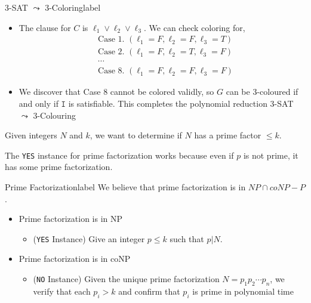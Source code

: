 \begin{ex}{3-SAT $\leadsto$ 3-Coloring}{label}
\begin{itemize}
 			\item The clause for $C$ is $\ell_1 \lor \ell_2 \lor \ell_3$. We can check coloring for,
 			\begin{align*}
 				&\text{Case 1. $(\ell_1 = F, \ell_2 = F, \ell_3 = T)$} \\
 				&\text{Case 2. $(\ell_1 = F, \ell_2 = T, \ell_3 = F)$} \\
 				&\cdots \\
 				&\text{Case 8. $(\ell_1 = F, \ell_2 = F, \ell_3 = F)$}
 			\end{align*}
 			\item We discover that Case 8 cannot be colored validly, so $G$ can be 3-coloured if and only if $\texttt{I}$ is satisfiable. This completes the polynomial reduction 3-SAT $\leadsto$ 3-Colouring
 		\end{itemize}
 	\end{ex}

 	\begin{defn}
 		Given integers $N$ and $k$, we want to determine if $N$ has a prime factor $\leq k$.
 	\end{defn}

 	\begin{marginfigure}
 		The \texttt{YES} instance for prime factorization works because even if $p$ is not prime, it has some prime factorization.
 	\end{marginfigure}

 	\begin{ex}{Prime Factorization}{label}
 		We believe that prime factorization is in $NP \cap coNP - P$.
 		\begin{itemize}
 			\item Prime factorization is in NP
 			\begin{itemize}
 				\item (\texttt{YES} Instance) Give an integer $p \leq k$ such that $p |N$. 
 			\end{itemize}
 			\item Prime factorization is in coNP
 			\begin{itemize}
 				\item (\texttt{NO} Instance) Given the unique prime factorization $N = p_1p_2 \cdots p_n$, we verify that each $p_i > k$ and confirm that $p_i$ is prime in polynomial time
 			\end{itemize}
 		\end{itemize}
 	\end{ex}

